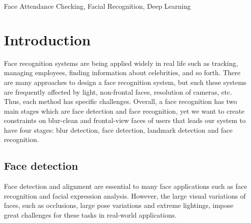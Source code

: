 \documentclass[journal, twocolumn]{IEEEtran}
\begin{document}
\begin{IEEEkeywords}
Face Attendance Checking, Facial Recognition, Deep Learning
\end{IEEEkeywords}


\IEEEpeerreviewmaketitle


\section{Introduction}
\label{introduction}

Face recognition systems are being applied widely in real life such as tracking, managing employees, finding information about celebrities, and so forth. There are many approaches to design a face recognition system, but such these systems are frequently affected by light, non-frontal faces, resolution of cameras, etc. Thus, each method has specific challenges. Overall, a face recognition has two main stages which are face detection and face recognition, yet we want to create constraints on blur-clean and frontal-view faces of users that leads our system to have four stages: blur detection, face detection, landmark detection and face recognition.  


\subsection{Face detection}
Face detection and alignment are essential to many face applications such as face recognition and facial expression analysis. However, the large visual variations of faces, such as occlusions, large pose variations and extreme lightings, impose
great challenges for these tasks in real-world applications.
\end{document}
